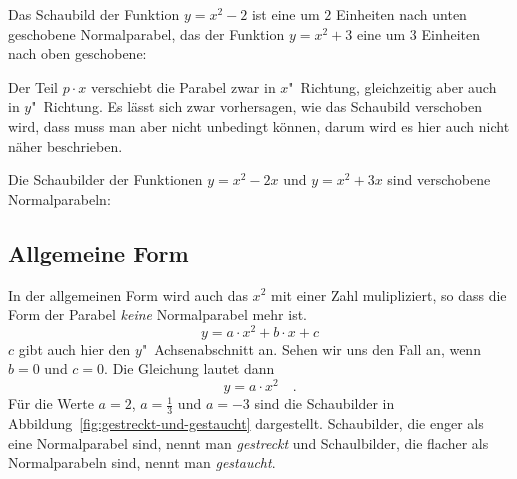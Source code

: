 \documentclass[load-fonts,babel=ngerman]{arbeitsblatt}
\begin{document}
\begin{beispiel}
  Das Schaubild der Funktion $y=x^2-2$ ist eine um $2$ Einheiten nach unten
  geschobene Normalparabel, das der Funktion $y=x^2+3$ eine um $3$ Einheiten
  nach oben geschobene:
  \begin{center}
  \end{center}
\end{beispiel}

Der Teil $p\cdot x$ verschiebt die Parabel zwar in $x$"~Richtung, gleichzeitig
aber auch in $y$"~Richtung.  Es lässt sich zwar vorhersagen, wie das Schaubild
verschoben wird, dass muss man aber nicht unbedingt können, darum wird es hier
auch nicht näher beschrieben.

\begin{beispiel}
  Die Schaubilder der Funktionen $y=x^2-2x$ und $y=x^2+3x$ sind verschobene
  Normalparabeln:
  \begin{center}
  \end{center}
\end{beispiel}

\subsection{Allgemeine Form}
In der allgemeinen Form wird auch das $x^2$ mit einer Zahl mulipliziert, so
dass die Form der Parabel \emph{keine} Normalparabel mehr ist.
\begin{equation}
  \label{eq:allgemeine-form}
  y = a\cdot x^2 + b\cdot x + c
\end{equation}
$c$ gibt auch hier den $y$"~Achsenabschnitt an.  Sehen wir uns den Fall an,
wenn $b=0$ und $c=0$.  Die Gleichung lautet dann
\begin{equation}
  \label{eq:ax**2}
  y = a\cdot x^2 \quad.
\end{equation}
Für die Werte $a=2$, $a=\frac{1}{3}$ und $a=-3$ sind die Schaubilder in
Abbildung~\vref{fig:gestreckt-und-gestaucht} dargestellt.  Schaubilder, die
enger als eine Normalparabel sind, nennt man \emph{gestreckt} und
Schaulbilder, die flacher als Normalparabeln sind, nennt man \emph{gestaucht}.
\end{document}

